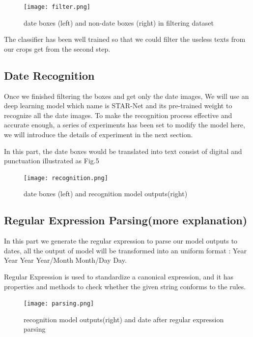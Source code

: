 \documentclass{article}
\begin{document}
\begin{figure}[ht] \centering    
	\label{filtering}     
	\texttt{[image: filter.png]}  
   
	\caption{date boxes (left) and non-date boxes (right) in filtering dataset}
\end{figure}

The classifier has been well trained so that we could filter the useless texts from our crops get from the second step.

\subsection{Date Recognition}

Once we finished filtering the boxes and get only the date images, We will use an deep learning model which name is STAR-Net and its pre-trained weight to recognize all the date images. To make the recognition process effective and accurate enough, a series of experiments has been set to modify the model here, we will introduce the details of experiment in the next section.\par
In this part, the date boxes would be translated into text consist of digital and punctuation illustrated as Fig.5

\begin{figure}[ht] \centering    
	\label{recognition}     
	\texttt{[image: recognition.png]}  
   
	\caption{date boxes (left) and recognition model outputs(right)}
\end{figure}

\subsection{Regular Expression Parsing(more explanation)}

In this part we generate the regular expression to parse our model outputs to dates, all the output of model will be transformed into an uniform format : Year Year Year Year/Month Month/Day Day.

Regular Expression is  used to standardize a canonical expression, and it has properties and methods to check whether the given string conforms to the rules.\par

\begin{figure}[ht] \centering    
	\label{parsing}     
	\texttt{[image: parsing.png]}  
   
	\caption{recognition model outputs(right) and date after regular expression parsing}
\end{figure}
\end{document}
